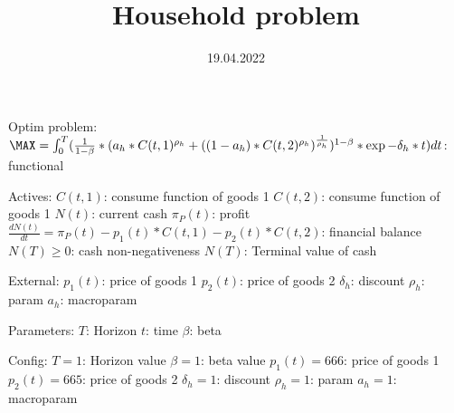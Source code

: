 \documentclass[12pt]{article}
\title{Household problem}
\date{19.04.2022}
\begin{document}
Optim problem:
    $\MAX = \int_0^T (\frac{1}{1-\beta} * (a_{h} * C(t, 1)^{\rho_{h}} + ((1-a_{h})*C(t, 2)^{\rho_{h}})^{\frac{1}{\rho_{h}}})^{1-\beta} * \exp{-\delta_{h}*t})dt$: functional

Actives:
    $C(t, 1)$: consume function of goods 1
    $C(t, 2)$: consume function of goods 1
    $N(t)$: current cash
    $\pi_{P}(t)$: profit
    $\frac{dN(t)}{dt} = \pi_{P}(t) - p_{1}(t)*C(t,1) - p_{2}(t)*C(t,2)$: financial balance
    $N(T) \geq 0$: cash non-negativeness
    $N(T)$: Terminal value of cash

External:
    $p_{1}(t)$: price of goods 1
    $p_{2}(t)$: price of goods 2
    $\delta_{h}$: discount
    $\rho_{h}$: param
    $a_{h}$: macroparam

Parameters:
    $T$: Horizon
    $t$: time
    $\beta$: beta

Config:
    $T=1$: Horizon value
    $\beta=1$: beta value
    $p_{1}(t)= 666$: price of goods 1
    $p_{2}(t)= 665$: price of goods 2
    $\delta_{h}=1$: discount
    $\rho_{h}=1$: param
    $a_{h}=1$: macroparam
\end{document}
